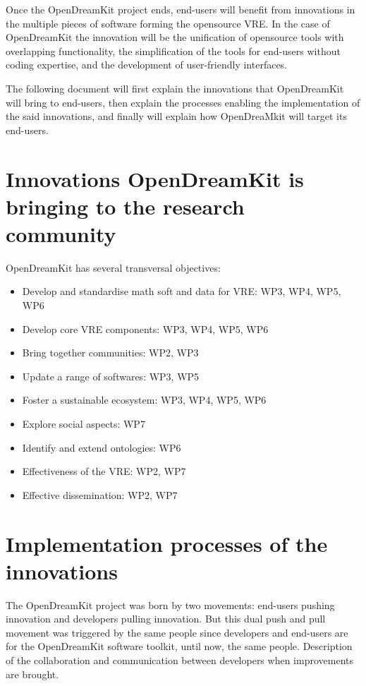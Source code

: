 \documentclass{deliverablereport}
\begin{document}
Once the OpenDreamKit project ends, end-users will benefit from innovations in the multiple pieces of software forming the opensource VRE. In the case of OpenDreamKit the innovation will be the unification of opensource tools with overlapping functionality, the simplification of the tools for end-users without coding expertise, and the development of user-friendly interfaces.

The following document will first explain the innovations that OpenDreamKit will bring to end-users, then explain the processes enabling the implementation of the said innovations, and finally will explain how OpenDreaMkit will target its end-users.


\section{Innovations OpenDreamKit is bringing to the research community}

OpenDreamKit has several transversal objectives:

\begin{itemize}
\item{Develop and standardise math soft and data for VRE: WP3, WP4, WP5, WP6}
\item{Develop core VRE components: WP3, WP4, WP5, WP6}
\item{Bring together communities: WP2, WP3}
\item{Update a range of softwares: WP3, WP5}
\item{Foster a sustainable ecosystem: WP3, WP4, WP5, WP6}
\item{Explore social aspects: WP7}
\item{Identify and extend ontologies: WP6}
\item{Effectiveness of the VRE: WP2, WP7}
\item{Effective dissemination: WP2, WP7}


\end{itemize}


\section{Implementation processes of the innovations}

The OpenDreamKit project was born by two movements: end-users pushing innovation and developers pulling innovation. But this dual push and pull movement was triggered by the same people since developers and end-users are for the OpenDreamKit software toolkit, until now, the same people.
Description of the collaboration and communication between developers when improvements are brought.
\end{document}
